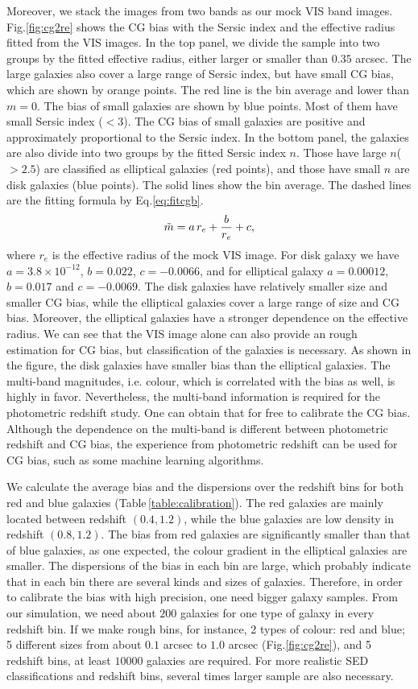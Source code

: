 \documentclass[useAMS,usenatbib]{mn2e}
\newcommand{\be}{\begin{equation}}
\newcommand{\ee}{\end{equation}}
\def\elabel#1{\label{eq:#1}}
\begin{document}
Moreover, we stack the images from two bands as our mock VIS band
images.  Fig.\ref{fig:cg2re} shows the CG bias with the Sersic index
and the effective radius fitted from the VIS images. In the top panel,
we divide the sample into two groups by the fitted effective radius, either
larger or smaller than $0.35$ arcsec. The large galaxies also cover a
large range of Sersic index, but have small CG bias, which are shown
by orange points. The red line is the bin average and lower than
$m=0$. The bias of small galaxies are shown by blue points. Most of
them have small Sersic index ($<3$). The CG bias of small galaxies
are positive and approximately proportional to the Sersic index.
%
In the bottom panel, the galaxies are also divide into two groups by
the fitted Sersic index $n$. Those have large $n$($>2.5$) are
classified as elliptical galaxies (red points), and those have small
$n$ are disk galaxies (blue points). The solid lines show the bin
average. The dashed lines are the fitting formula by
Eq.\ref{eq:fitcgb}.
%
\be
\tilde{m} = a\,r_e+{b\over r_e}+c,
\elabel{fitcgb}
\ee
%
where $r_e$ is the effective radius of the mock VIS image. For disk
galaxy we have $a=3.8\times10^{-12}$, $b=0.022$, $c=-0.0066$, and for
elliptical galaxy $a=0.00012$, $b=0.017$ and $c=-0.0069$. The disk
galaxies have relatively smaller size and smaller CG bias, while the
elliptical galaxies cover a large range of size and CG bias. Moreover,
the elliptical galaxies have a stronger dependence on the effective
radius.
%
We can see that the VIS image alone can also provide an rough
estimation for CG bias, but classification of the galaxies is
necessary. As shown in the figure, the disk galaxies have smaller bias
than the elliptical galaxies.
The multi-band magnitudes, i.e. colour, which is correlated
with the bias as well, is highly in favor. Nevertheless, the
multi-band information is required for the photometric redshift
study. One can obtain that for free to calibrate the CG bias. Although
the dependence on the multi-band is different between photometric
redshift and CG bias, the experience from photometric redshift can be
used for CG bias, such as some machine learning algorithms.


We calculate the average bias and the dispersions over the redshift
bins for both red and blue galaxies
(Table\,\ref{table:calibration}). The red galaxies are mainly located
between redshift $(0.4,1.2)$, while the blue galaxies are low density
in redshift $(0.8,1.2)$. The bias from red galaxies are significantly
smaller than that of blue galaxies, as one expected, the colour
gradient in the elliptical galaxies are smaller. The dispersions of
the bias in each bin are large, which probably indicate that in each
bin there are several kinds and sizes of galaxies.  Therefore, in
order to calibrate the bias with high precision, one need bigger
galaxy samples. From our simulation, we need about $200$ galaxies for
one type of galaxy in every redshift bin. If we make rough bins, for
instance, 2 types of colour: red and blue; 5 different sizes from
about $0.1$ arcsec to $1.0$ arcsec (Fig.\ref{fig:cg2re}), and 5
redshift bins, at least $10 000$ galaxies are required.  For more
realistic SED classifications and redshift bins, several times larger
sample are also necessary.
\end{document}
